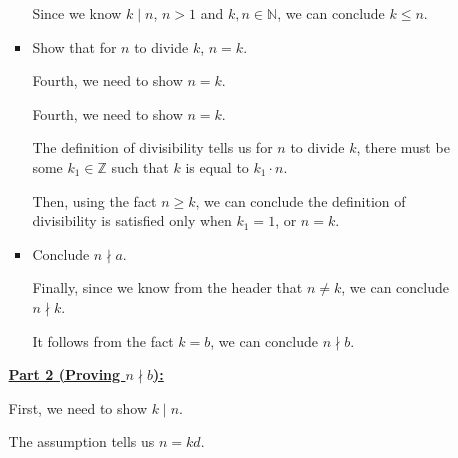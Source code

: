 \documentclass[12pt]{article}
\begin{document}
\begin{enumerate}[a.]
\begin{mdframed}
\begin{enumerate}[1.]
\begin{itemize}
\begin{mdframed}
            \bigskip

            Since we know $k \mid n$, $n > 1$ and $k,n \in \mathbb{N}$, we can conclude
            $k \leq n$.

            \end{mdframed}

            \item Show that for $n$ to divide $k$, $n = k$.

            \bigskip

            Fourth, we need to show $n = k$.

            \bigskip

            \begin{mdframed}
            Fourth, we need to show $n = k$.

            \bigskip

            The definition of divisibility tells us for $n$ to
            divide $k$, there must be some $k_1 \in \mathbb{Z}$ such that
            $k$ is equal to $k_1 \cdot n$.

            \bigskip

            Then, using the fact $n \geq k$, we can conclude the definition of
            divisibility is satisfied only when $k_1 = 1$, or $n = k$.

            \end{mdframed}

            \item Conclude $n \nmid a$.

            \begin{mdframed}
            Finally, since we know from the header that $n \neq k$, we can conclude
            $n \nmid k$.

            \bigskip

            It follows from the fact $k = b$, we can conclude $n \nmid b$.
            \end{mdframed}

        \end{itemize}

        \begin{mdframed}

        \underline{\textbf{Part 2 (Proving $n \nmid b$):}}

        \bigskip

        First, we need to show $k \mid n$.

        \bigskip

        The assumption tells us $n = kd$.


\end{mdframed}
\end{enumerate}
\end{mdframed}
\end{enumerate}
\end{document}
